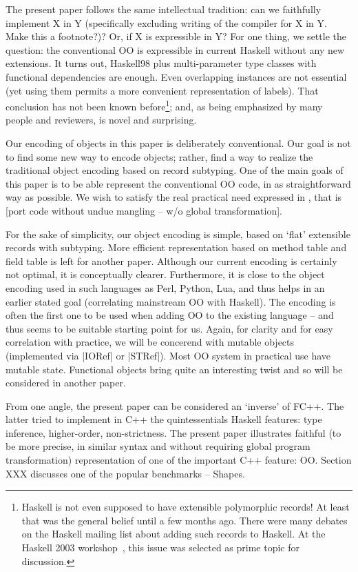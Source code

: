 The present paper follows the same intellectual tradition: can we
faithfully implement X in Y (specifically excluding writing of the
compiler for X in Y. Make this a footnote?)? Or, if X is expressible
\cite{Felleisen90} in Y?  For one thing, we settle the question: the
conventional OO is expressible in current Haskell without any new
extensions. It turns out, Haskell98 plus multi-parameter type classes
with functional dependencies are enough. Even overlapping instances
are not essential (yet using them permits a more convenient
representation of labels).  That conclusion has not been known
before\footnote{ Haskell is not even supposed to have extensible
  polymorphic records! At least that was the general belief until a
  few months ago.  There were many debates on the Haskell mailing list
  about adding such records to Haskell. At the Haskell 2003
  workshop~\cite{HW03}, this issue was selected as prime topic for
  discussion.}; and, as being emphasized by many people and reviewers,
is novel and surprising.

Our encoding of objects in this paper is deliberately conventional.
Our goal is not to find some new way to encode objects; rather, find a
way to realize the traditional object encoding based on record
subtyping. One of the main goals of this paper is to be able represent
the conventional OO code, in as straightforward way as possible.
We wish to satisfy the real practical need expressed in
\cite{MonadReader3}, that is [port code without undue mangling -- w/o
  global transformation].

For the sake of simplicity, our object encoding is simple, based on
`flat' extensible records with subtyping. More efficient
representation based on method table and field table is left for
another paper. Although our current encoding is certainly not
optimal, it is conceptually clearer. Furthermore, it is close to the
object encoding used in such languages as Perl, Python, Lua, and thus
helps in an earlier stated goal (correlating mainstream OO with
Haskell).  The encoding is often the first one to be used when adding
OO to the existing language -- and thus seems to be suitable starting
point for us.  Again, for clarity and for easy correlation with
practice, we will be concerend with mutable objects (implemented via
|IORef| or |STRef|). Most OO system in
practical use have mutable state. Functional objects bring quite
an interesting twist and so will be considered in another paper.

From one angle, the present paper can be considered an `inverse' of
FC++. The latter tried to implement in C++ the quintessentials Haskell
features: type inference, higher-order, non-strictness. The present
paper illustrates faithful (to be more precise, in similar syntax and
without requiring global program transformation) representation of one
of the important C++ feature: OO. Section XXX discusses one of the
popular benchmarks -- Shapes. 


